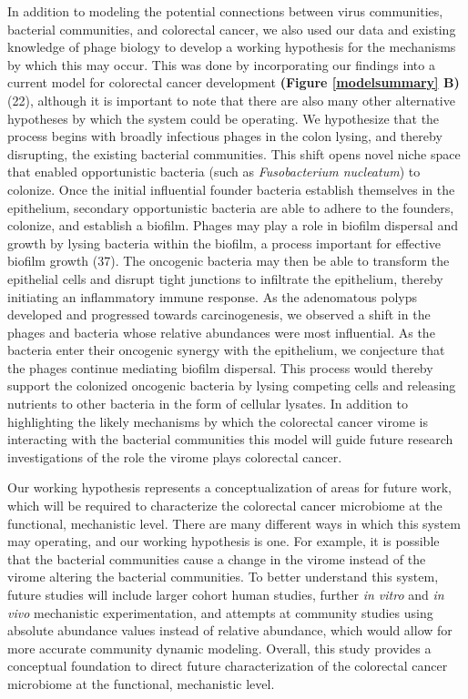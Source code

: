 \documentclass[12pt,]{article}
\begin{document}
In addition to modeling the potential connections between virus
communities, bacterial communities, and colorectal cancer, we also used
our data and existing knowledge of phage biology to develop a working
hypothesis for the mechanisms by which this may occur. This was done by
incorporating our findings into a current model for colorectal cancer
development \textbf{(Figure \ref{modelsummary} B)} (22), although it is
important to note that there are also many other alternative hypotheses
by which the system could be operating. We hypothesize that the process
begins with broadly infectious phages in the colon lysing, and thereby
disrupting, the existing bacterial communities. This shift opens novel
niche space that enabled opportunistic bacteria (such as
\emph{Fusobacterium nucleatum}) to colonize. Once the initial
influential founder bacteria establish themselves in the epithelium,
secondary opportunistic bacteria are able to adhere to the founders,
colonize, and establish a biofilm. Phages may play a role in biofilm
dispersal and growth by lysing bacteria within the biofilm, a process
important for effective biofilm growth (37). The oncogenic bacteria may
then be able to transform the epithelial cells and disrupt tight
junctions to infiltrate the epithelium, thereby initiating an
inflammatory immune response. As the adenomatous polyps developed and
progressed towards carcinogenesis, we observed a shift in the phages and
bacteria whose relative abundances were most influential. As the
bacteria enter their oncogenic synergy with the epithelium, we
conjecture that the phages continue mediating biofilm dispersal. This
process would thereby support the colonized oncogenic bacteria by lysing
competing cells and releasing nutrients to other bacteria in the form of
cellular lysates. In addition to highlighting the likely mechanisms by
which the colorectal cancer virome is interacting with the bacterial
communities this model will guide future research investigations of the
role the virome plays colorectal cancer.

Our working hypothesis represents a conceptualization of areas for
future work, which will be required to characterize the colorectal
cancer microbiome at the functional, mechanistic level. There are many
different ways in which this system may operating, and our working
hypothesis is one. For example, it is possible that the bacterial
communities cause a change in the virome instead of the virome altering
the bacterial communities. To better understand this system, future
studies will include larger cohort human studies, further \emph{in
vitro} and \emph{in vivo} mechanistic experimentation, and attempts at
community studies using absolute abundance values instead of relative
abundance, which would allow for more accurate community dynamic
modeling. Overall, this study provides a conceptual foundation to direct
future characterization of the colorectal cancer microbiome at the
functional, mechanistic level.
\end{document}
